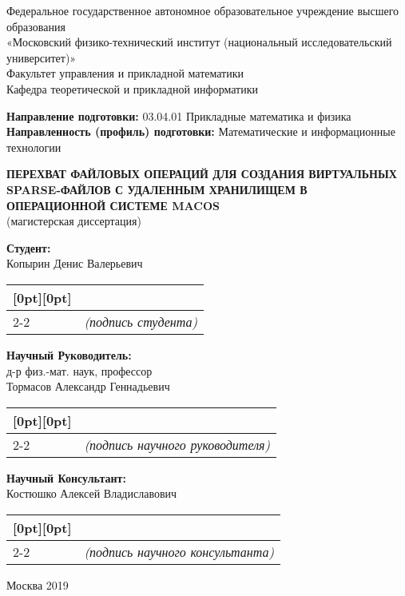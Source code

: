 \documentclass[14pt, a4paper]{extarticle}
\newcommand{\signature}[2][16em]{%
  \hspace{-18.2em}
  \begin{tabular}[t]{ p{#1} p{#1} }
    \raisebox{-.5ex}[0pt][0pt]{\bfseries } & \\
    \cline{2-2}
    & \centering\scriptsize\itshape (#2)
  \end{tabular}
}
\begin{document}
\begin{center}
Федеральное государственное автономное образовательное учреждение высшего образования \\
«Московский физико-технический институт (национальный исследовательский университет)» \\
Факультет управления и прикладной математики \\
Кафедра теоретической и прикладной информатики \\
\end{center}

\noindent
\textbf{Направление подготовки:} 03.04.01 Прикладные математика и физика \\
\textbf{Направленность (профиль) подготовки:} Математические и информационные технологии 

\vspace*{\fill}
\begin{center}
\begin{minipage}{0.8\linewidth}
\begin{center}
\noindent
\textbf{ПЕРЕХВАТ ФАЙЛОВЫХ ОПЕРАЦИЙ ДЛЯ СОЗДАНИЯ ВИРТУАЛЬНЫХ SPARSE-ФАЙЛОВ С УДАЛЕННЫМ ХРАНИЛИЩЕМ В ОПЕРАЦИОННОЙ СИСТЕМЕ MACOS} \\
{(магистерская диссертация)}
\end{center}
\end{minipage}
\end{center}
\vspace*{\fill}

\hfill\begin{minipage}{0.5\linewidth}
\textbf{Студент:} \\
Копырин Денис Валерьевич \\

\signature{подпись студента}
\textbf{Научный Руководитель:} \\
д-р физ.-мат. наук, профессор \\
Тормасов Александр Геннадьевич \\

\signature{подпись научного руководителя}
\textbf{Научный Консультант:} \\
Костюшко Алексей Владиславович \\

\hspace{1.4em}\signature{подпись научного консультанта}
\end{minipage}

\begin{center}
Москва 2019
\end{center}
\end{document}
